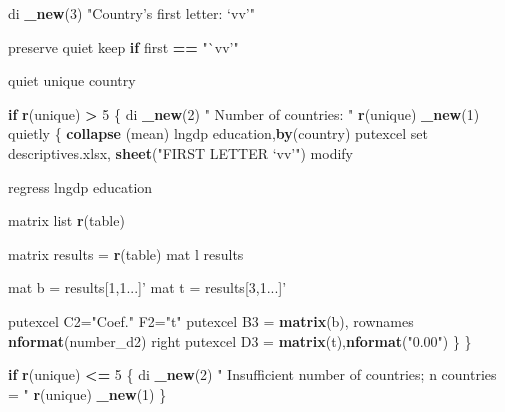 \documentclass[
  12pt,
]{article}
\newenvironment{Shaded}{\begin{snugshade}}{\end{snugshade}}
\newcommand{\ControlFlowTok}[1]{\textcolor[rgb]{0.13,0.29,0.53}{\textbf{#1}}}
\newcommand{\DecValTok}[1]{\textcolor[rgb]{0.00,0.00,0.81}{#1}}
\newcommand{\KeywordTok}[1]{\textcolor[rgb]{0.13,0.29,0.53}{\textbf{#1}}}
\newcommand{\NormalTok}[1]{#1}
\newcommand{\OperatorTok}[1]{\textcolor[rgb]{0.81,0.36,0.00}{\textbf{#1}}}
\newcommand{\StringTok}[1]{\textcolor[rgb]{0.31,0.60,0.02}{#1}}
\begin{document}
\begin{Shaded}
\begin{Highlighting}[]
{\NormalTok{        di }\KeywordTok{_new}\NormalTok{(}\DecValTok{3}\NormalTok{) }\StringTok{"Country's first letter: `vv'"}
        
\NormalTok{        preserve}
\NormalTok{        quiet keep }\ControlFlowTok{if}\NormalTok{ first }\OperatorTok{==}\StringTok{ "`vv'"}
        
\NormalTok{        quiet unique country}
            
            \ControlFlowTok{if} \KeywordTok{r}\NormalTok{(unique) }\OperatorTok{>}\StringTok{ }\DecValTok{5}\NormalTok{ \{}
\NormalTok{            di }\KeywordTok{_new}\NormalTok{(}\DecValTok{2}\NormalTok{) }\StringTok{"    Number of countries:    "} \KeywordTok{r}\NormalTok{(unique) }\KeywordTok{_new}\NormalTok{(}\DecValTok{1}\NormalTok{)}
\NormalTok{            quietly \{}
                \KeywordTok{collapse}\NormalTok{ (mean) lngdp education,}\KeywordTok{by}\NormalTok{(country)}
\NormalTok{                    putexcel set descriptives.xlsx, }\KeywordTok{sheet}\NormalTok{(}\StringTok{"FIRST LETTER `vv'"}\NormalTok{) modify}
                    
\NormalTok{                    regress lngdp education}
                        
\NormalTok{                            matrix list }\KeywordTok{r}\NormalTok{(table)}
                        
\NormalTok{                        matrix results =}\StringTok{ }\KeywordTok{r}\NormalTok{(table)}
\NormalTok{                            mat l results}
                        
\NormalTok{                        mat b =}\StringTok{ }\NormalTok{results[}\DecValTok{1}\NormalTok{,}\DecValTok{1}\NormalTok{...]}\StringTok{'}
\StringTok{                        mat t = results[3,1...]'}
                        
\NormalTok{                        putexcel C2=}\StringTok{"Coef."}\NormalTok{ F2=}\StringTok{"t"}
\NormalTok{                        putexcel B3 =}\StringTok{ }\KeywordTok{matrix}\NormalTok{(b), rownames }\KeywordTok{nformat}\NormalTok{(number_d2) right}
\NormalTok{                        putexcel D3 =}\StringTok{ }\KeywordTok{matrix}\NormalTok{(t),}\KeywordTok{nformat}\NormalTok{(}\StringTok{"0.00"}\NormalTok{)}
\NormalTok{                \}}
\NormalTok{            \}}
            
            \ControlFlowTok{if} \KeywordTok{r}\NormalTok{(unique) }\OperatorTok{<=}\StringTok{ }\DecValTok{5}\NormalTok{ \{}
\NormalTok{                di }\KeywordTok{_new}\NormalTok{(}\DecValTok{2}\NormalTok{) }\StringTok{"    Insufficient number of countries; n countries = "} \KeywordTok{r}\NormalTok{(unique) }\KeywordTok{_new}\NormalTok{(}\DecValTok{1}\NormalTok{)}
\NormalTok{            \}}
            
}
\end{Highlighting}
\end{Shaded}
\end{document}
